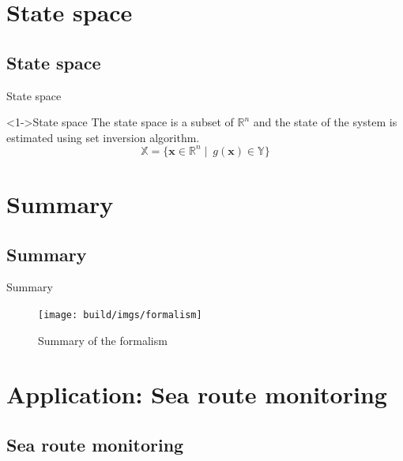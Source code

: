 \documentclass{beamer}
\begin{document}
    \section{State space}

        \subsection{State space}

            \begin{frame}{State space}
                \begin{block}<1->{State space}
                    The state space is a subset of $\mathbb{R}^n$ and the state of the system is estimated using set inversion algorithm.
                    \begin{equation}
                        \mathbb{X} = \lbrace \mathbf{x} \in \mathbb{R}^n \mid\ g(\mathbf{x}) \in \mathbb{Y}\rbrace
                    \end{equation}
                \end{block}
            \end{frame}

    \section{Summary}

        \subsection{Summary}

        \begin{frame}{Summary}
            \begin{figure}
                \texttt{[image: build/imgs/formalism]}
                \caption{Summary of the formalism}
            \end{figure}
        \end{frame}

    \section{Application: Sea route monitoring}

        \subsection{Sea route monitoring}
\end{document}
